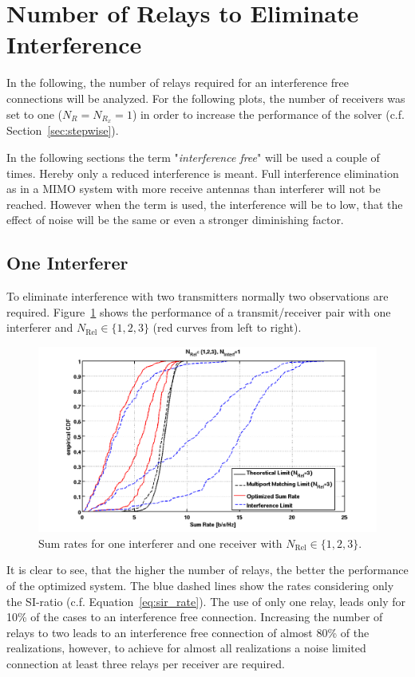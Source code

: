 \section{Number of Relays to Eliminate Interference}
\label{sec:interf_fix}
In the following, the number of relays required for an interference free connections will be analyzed.
For the following plots, the number of receivers was set to one ($N_{R} = N_{R_x} = 1$) in order to increase the performance of the solver (c.f. Section~\ref{sec:stepwise}).

In the following sections the term "\textit{interference free}" will be used a couple of times.
Hereby only a reduced interference is meant.
Full interference elimination as in a MIMO system with more receive antennas than interferer will not be reached.
However when the term is used, the interference will be to low, that the effect of noise will be the same or even a stronger diminishing factor.

\subsection{One Interferer}
\label{sec:1interf}
To eliminate interference with two transmitters normally two observations are required.
Figure~\ref{fig:relcomp_1} shows the performance of a transmit/receiver pair with one interferer and $N_\text{Rel}\in\{1,2,3\}$ (red curves from left to right).
\begin{figure}[h]
\centering
  \includegraphics[width=0.8\linewidth]{images/Relcomparison_1interferer.png}
\caption{Sum rates for one interferer and one receiver with  $N_\text{Rel}\in\{1,2,3\}$.}
\label{fig:relcomp_1}
\end{figure}
It is clear to see, that the higher the number of relays, the better the performance of the optimized system.
The blue dashed lines show the rates considering only the SI-ratio (c.f. Equation~\eqref{eq:sir_rate}).
The use of only one relay, leads only for 10\% of the cases to an interference free connection.
Increasing the number of relays to two leads to an interference free connection of almost 80\% of the realizations, however, to achieve for almost all realizations a noise limited connection at least three relays per receiver are required.


